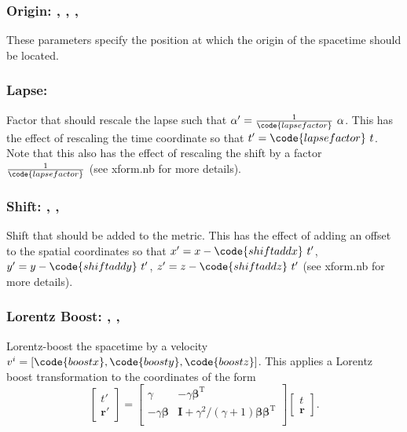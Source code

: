 \documentclass{article}
\begin{document}
\subsubsection{Origin: , , , }
These parameters specify the position at which the origin of the spacetime
should be located.

\subsubsection{Lapse: }
Factor that should rescale the lapse such that
$\alpha' = \tfrac{1}{\code{lapsefactor}}~ \alpha$. This has the effect of rescaling the time
coordinate so that $t' = \code{lapsefactor}~ t$. Note that this also has the
effect of rescaling the shift by a factor $\tfrac{1}{\code{lapsefactor}}$ (see xform.nb
for more details).

\subsubsection{Shift: , , }
Shift that should be added to the metric. This has the effect of adding an
offset to the spatial coordinates so that $x' = x - \code{shiftaddx}~ t'$,
$y' = y - \code{shiftaddy}~ t'$,  $z' = z - \code{shiftaddz}~ t'$ (see xform.nb
for more details).

\subsubsection{Lorentz Boost: , , }
Lorentz-boost the spacetime by a velocity
$v^i = [\code{boostx}, \code{boosty}, \code{boostz}]$. This applies a
Lorentz boost transformation to the coordinates of the form
\begin{equation}
\begin{bmatrix}
t' \\
\mathbf{r'}
\end{bmatrix}
=
\begin{bmatrix}
\gamma & - \gamma \boldsymbol{\beta}^{\mathrm{T}} \\
-\gamma\boldsymbol{\beta} & \mathbf{I} + \gamma^2 / (\gamma+1) \boldsymbol{\beta}\boldsymbol{\beta}^{\mathrm{T}}  \\
\end{bmatrix}
\begin{bmatrix}
t  \\
\mathbf{r}
\end{bmatrix}.
\end{equation}
\end{document}
